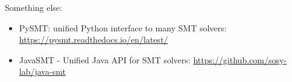 Something else:

\begin{itemize}

\item PySMT: unified Python interface to many SMT solvers: \url{https://pysmt.readthedocs.io/en/latest/}

\item JavaSMT - Unified Java API for SMT solvers: \url{https://github.com/sosy-lab/java-smt}

\end{itemize}

